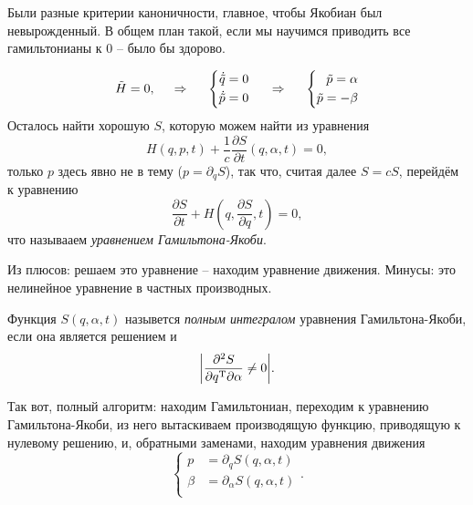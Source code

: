 Были разные критерии каноничности, главное, чтобы Якобиан был невырожденный. В общем план такой, если мы научимся приводить все гамильтонианы к $0$ -- было бы здорово.

\begin{equation*}
    \tilde{H} = 0, \hspace{0.5cm} \Rightarrow \hspace{0.5cm}
    \left\{\begin{aligned}
        \dot{\tilde{q}} = 0 \\
        \dot{\tilde{p}} = 0 \\
    \end{aligned}\right.
    \hspace{0.5cm} \Rightarrow \hspace{0.5cm}
    \left\{\begin{aligned}
        \tilde{p} = \alpha \\
        \tilde{p} = - \beta
    \end{aligned}\right.
\end{equation*}
Осталось найти хорошую $S$, которую можем найти из уравнения
\begin{equation*}
    H(q, p, t) + \frac{1}{c} \frac{\partial S}{\partial t} (q, \alpha, t) = 0,
\end{equation*}
только $p$ здесь явно не в тему ($p = \partial_q S$), так что, считая далее $S = c S$, перейдём к уравнению
\begin{equation}
    \frac{\partial S}{\partial t} + H\left(q, \frac{\partial S}{\partial q}, t\right) = 0,
\end{equation}
что называаем \textit{уравнением Гамильтона-Якоби}.

Из плюсов: решаем это уравнение -- находим уравнение движения. Минусы: это нелинейное уравнение в частных производных. 

\begin{to_def}
    Функция $S(q, \alpha, t)$ назывется \textit{полным интегралом} уравнения Гамильтона-Якоби, если она является решением  и 
    \begin{equation*}
        \bigg|
            \frac{\partial^2 S}{\partial q^{\text{T}} \partial \alpha} \neq 0
        \bigg|.
    \end{equation*}
\end{to_def}

Так вот, полный алгоритм: находим Гамильтониан, переходим к уравнению Гамильтона-Якоби, из него вытаскиваем производящую функцию, приводящую к нулевому решению, и, обратными заменами, находим уравнения движения
\begin{equation*}
    \left\{\begin{aligned}
        p &= \partial_q S (q, \alpha, t) \\
        \beta &= \partial_\alpha S (q, \alpha, t) \\
    \end{aligned}\right.
    .
\end{equation*}

